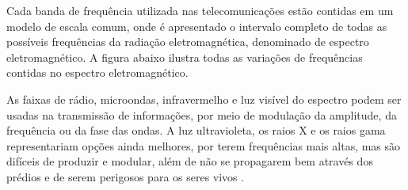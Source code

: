 \begin{figure}[H]
	\centering
\end{figure}

Cada banda de frequência utilizada nas telecomunicações estão contidas em um modelo de escala comum, onde é apresentado o intervalo completo de todas as possíveis frequências da radiação eletromagnética, denominado de espectro eletromagnético. A figura abaixo ilustra todas as variações de frequências contidas no espectro eletromagnético.

\begin{figure}[H]
	\centering
\end{figure}

\begin{citacao}
	As faixas de rádio, microondas, infravermelho e luz visível do espectro podem ser usadas na transmissão de informações, por meio de modulação da amplitude, da frequência ou da fase das ondas. A luz ultravioleta, os raios X e os raios gama representariam opções ainda melhores, por terem frequências mais altas, mas são difíceis de produzir e modular, além de não se propagarem bem através dos prédios e de serem perigosos para os seres vivos \cite{tanenbaum2011}.
\end{citacao}

